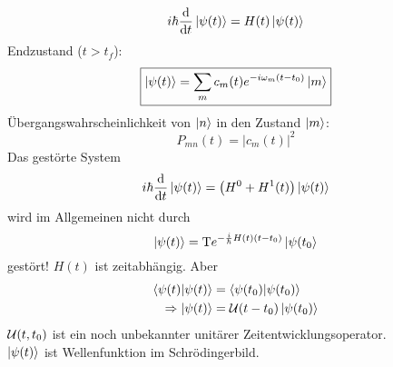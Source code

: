		\begin{equation*}
			i \hbar \frac{\mathrm{d}}{\mathrm{d} t} \ket{\psi(t)} = H(t) \ket{\psi(t)}
		\end{equation*}
	Endzustand ($t>t_f$):
		\begin{equation*}
			\boxed{ \ket{\psi(t)} = 
			\sum_m c_m(t) e^{-i \omega_m (t-t_0)} \ket{m}
			}
		\end{equation*}
	Übergangswahrscheinlichkeit von $\ket{n}$ in den Zustand $\ket{m}$:
		\begin{equation*}
			\boxed{P_{mn} (t) = |c_m(t)|^2}
		\end{equation*}
	Das gestörte System
		\begin{equation*}
			i \hbar \frac{\mathrm{d}}{\mathrm{d} t} \ket{\psi(t)}
			= \left( H^0 + H^1(t) \right) \ket{\psi(t)}
		\end{equation*}
	wird im Allgemeinen nicht durch
		\begin{equation*}
			\ket{\psi(t)} = \text{T} e^{-\frac{i}{\hbar} H(t) (t-t_0)} \ket{\psi(t_0}
		\end{equation*}
	gestört! $H(t)$ ist zeitabhängig.
	Aber 
		\begin{align*}
			\braket{\psi(t) | \psi(t)} &= \braket{\psi(t_0) | \psi(t_0)} \\
			\Rightarrow \ket{\psi(t)} &= \mathcal{U}(t-t_0) \ket{\psi(t_0)}
		\end{align*}
	$\mathcal{U}(t,t_0)$ ist ein noch unbekannter unitärer Zeitentwicklungsoperator.\\
	$\ket{\psi(t)}$ ist Wellenfunktion im Schrödingerbild.
	
